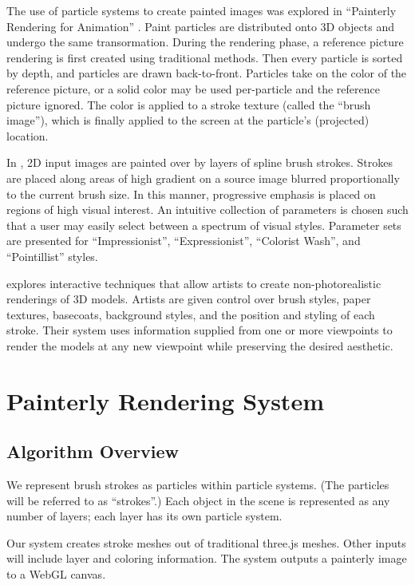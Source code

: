 \documentclass[conference]{acmsiggraph}
\begin{document}
The use of particle systems to create painted images was explored in
``Painterly Rendering for Animation'' \cite{Meier:1996:PRA:237170.237288}.
Paint particles are distributed onto 3D objects and undergo the same
transormation. During the rendering phase, a reference picture rendering is
first created using traditional methods. Then every particle is sorted by
depth, and particles are drawn back-to-front. Particles take on the color of
the reference picture, or a solid color may be used per-particle and the
reference picture ignored. The color is applied to a stroke texture (called
the ``brush image''), which is finally applied to the screen at the particle's
(projected) location.

In \cite{Hertzmann:1998:PRC:280814.280951}, 2D input images are painted over
by layers of spline brush strokes. Strokes are placed along areas of high
gradient on a source image blurred proportionally to the current brush size. In
this manner, progressive emphasis is  placed on regions of high visual
interest. An intuitive collection of parameters is chosen such that a user may
easily select between a spectrum of visual styles. Parameter sets are presented
for ``Impressionist'', ``Expressionist'', ``Colorist Wash'', and ``Pointillist''
styles.

\cite{Kalnins:2002:WND:566570.566648} explores interactive techniques that
allow artists to create non-photorealistic renderings of 3D models. Artists are
given control over brush styles, paper textures, basecoats, background styles,
and the position and styling of each stroke. Their system uses information
supplied from one or more viewpoints to render the models at any new viewpoint
while preserving the desired aesthetic.


\section{Painterly Rendering System}

\subsection{Algorithm Overview}

We represent brush strokes as particles within particle systems. (The particles
will be referred to as ``strokes''.) Each object in the scene is represented as
any number of layers; each layer has its own particle system.

Our system creates stroke meshes out of traditional three.js meshes. Other
inputs will include layer and coloring information. The system outputs a
painterly image to a WebGL canvas.
\end{document}

